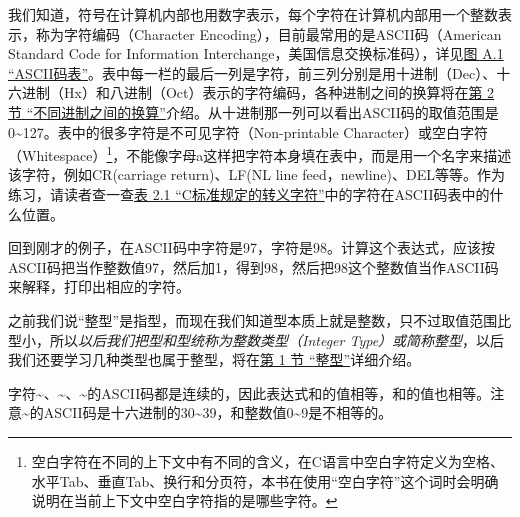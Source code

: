 我们知道，符号在计算机内部也用数字表示，每个字符在计算机内部用一个整数表示，称为字符编码（Character Encoding），目前最常用的是ASCII码（American Standard Code for Information Interchange，美国信息交换标准码），详见\hyperlink{db.apas01.id2905808}{图 A.\BookSplit{}1 “ASCII码表”}。表中每一栏的最后一列是字符，前三列分别是用十进制（Dec）、十六进制（Hx）和八进制（Oct）表示的字符编码，各种进制之间的换算将在\hyperlink{db.ch14s02.id2753213}{第 2 节 “不同进制之间的换算”}介绍。从十进制那一列可以看出ASCII码的取值范围是0\textasciitilde{}\BookSplit{}127。表中的很多字符是不可见字符（Non-printable Character）或空白字符（Whitespace）\footnote[3]{空白字符在不同的上下文中有不同的含义，在C语言中空白字符定义为空格、水平Tab、垂直Tab、换行和分页符，本书在使用“空白字符”这个词时会明确说明在当前上下文中空白字符指的是哪些字符。}，不能像字母a这样把字符本身填在表中，而是用一个名字来描述该字符，例如CR(carriage return)、LF(NL line feed，newline)、DEL等等。作为练习，请读者查一查\hyperlink{db.ch02s01.id2707486}{表 2.\BookSplit{}1 “C标准规定的转义字符”}中的字符在ASCII码表中的什么位置。



回到刚才的例子，在ASCII码中字符是97，字符是98。计算这个表达式，应该按ASCII码把当作整数值97，然后加1，得到98，然后把98这个整数值当作ASCII码来解释，打印出相应的字符。



之前我们说“整型”是指型，而现在我们知道型本质上就是整数，只不过取值范围比型小，所以\emph{以后我们把型和型统称为整数类型（Integer Type）或简称整型}，以后我们还要学习几种类型也属于整型，将在\hyperlink{db.ch15s01.id2756569}{第 1 节 “整型”}详细介绍。



字符\textasciitilde{}、\textasciitilde{}、\textasciitilde{}的ASCII码都是连续的，因此表达式和的值相等，和的值也相等。注意\textasciitilde{}的ASCII码是十六进制的30\textasciitilde{}\BookSplit{}39，和整数值0\textasciitilde{}\BookSplit{}9是不相等的。



